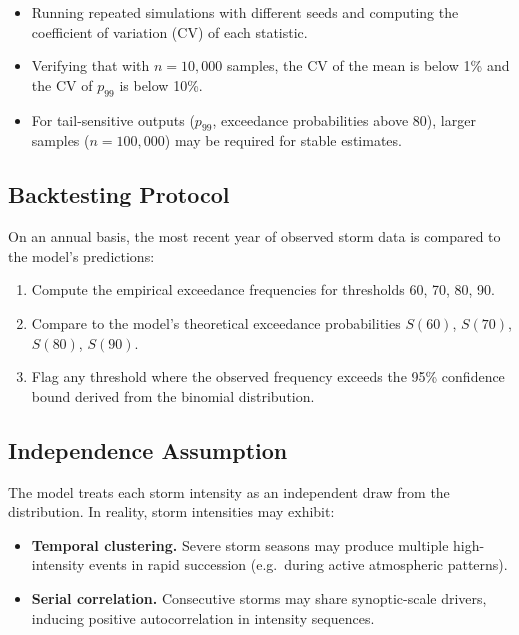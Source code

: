 \documentclass[11pt,a4paper]{article}
\begin{document}
\begin{itemize}[nosep]
    \item Running repeated simulations with different seeds and computing the
          coefficient of variation (CV) of each statistic.
    \item Verifying that with $n = 10{,}000$ samples, the CV of the mean is below
          1\% and the CV of $p_{99}$ is below 10\%.
    \item For tail-sensitive outputs ($p_{99}$, exceedance probabilities above 80),
          larger samples ($n = 100{,}000$) may be required for stable estimates.
\end{itemize}

\subsection{Backtesting Protocol}

On an annual basis, the most recent year of observed storm data is compared to the
model's predictions:
\begin{enumerate}[nosep]
    \item Compute the empirical exceedance frequencies for thresholds 60, 70, 80, 90.
    \item Compare to the model's theoretical exceedance probabilities
          $S(60)$, $S(70)$, $S(80)$, $S(90)$.
    \item Flag any threshold where the observed frequency exceeds the 95\%
          confidence bound derived from the binomial distribution.
\end{enumerate}

\mkmlimitations

\subsection{Independence Assumption}

The model treats each storm intensity as an independent draw from the distribution.
In reality, storm intensities may exhibit:
\begin{itemize}[nosep]
    \item \textbf{Temporal clustering.} Severe storm seasons may produce multiple
          high-intensity events in rapid succession (e.g.\ during active atmospheric
          patterns).
    \item \textbf{Serial correlation.} Consecutive storms may share synoptic-scale
          drivers, inducing positive autocorrelation in intensity sequences.
\end{itemize}
\end{document}
